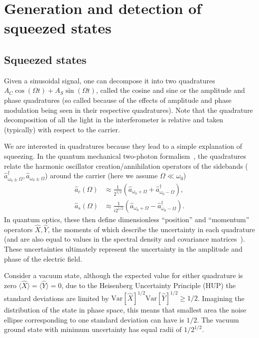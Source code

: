 \documentclass[aps,pra,superscriptaddress,reprint,nofootinbib]{revtex4-1}
\begin{document}
\section{Generation and detection of squeezed states}
\label{sec:squeezing}

\subsection{Squeezed states}

Given a sinusoidal signal, one can decompose it into two quadratures $A_C \cos(\Omega t) + A_S \sin(\Omega t)$, called the cosine and sine or the amplitude and phase quadratures (so called because of the effects of amplitude and phase modulation being seen in their respective quadratures). Note that the quadrature decomposition of all the light in the interferometer is relative and taken (typically) with respect to the carrier.


We are interested in quadratures because they lead to a simple explanation of squeezing. In the quantum mechanical two-photon formalism~\cite{Danilishin_2012}, the quadratures relate the harmonic oscillator creation/annihilation operators of the sidebands ($\hat{a}_{\omega_0 \pm \Omega}^\dagger, \hat{a}_{\omega_0 \pm \Omega}$) around the carrier (here we assume $\Omega \ll \omega_0$)
\begin{align*}
\hat{a}_c(\Omega) &\approx \frac{1}{2^{1/2}} (\hat{a}_{\omega_0 + \Omega} + \hat{a}_{\omega_0 - \Omega}^\dagger),\\
\hat{a}_s(\Omega) &\approx \frac{1}{i 2^{1/2}} (\hat{a}_{\omega_0 + \Omega} - \hat{a}_{\omega_0 - \Omega}^\dagger).
\end{align*}
In quantum optics, these then define dimensionless “position” and “momentum” operators $\hat{X}, \hat{Y}$, the moments of which describe the uncertainty in each quadrature (and are also equal to values in the spectral density and covariance matrices~\cite{Danilishin_2012}). These uncertainties ultimately represent the uncertainty in the amplitude and phase of the electric field.


Consider a vacuum state, although the expected value for either quadrature is zero $\langle \hat{X} \rangle = \langle \hat{Y} \rangle = 0$, due to the Heisenberg Uncertainty Principle (HUP) the standard deviations are limited by $\mathrm{Var}[\hat{X}]^{1/2} \mathrm{Var}[\hat{Y}]^{1/2} \geq 1/2$. Imagining the distribution of the state in phase space, this means that smallest area the noise ellipse corresponding to one standard deviation can have is $1/2$. The vacuum ground state with minimum uncertainty has equal radii of $1/2^{1/2}$.
\end{document}
